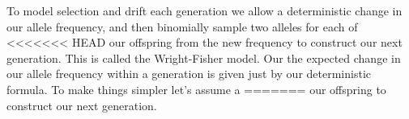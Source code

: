 

 To model selection and drift each generation we allow a deterministic change in our
allele frequency, and then binomially sample two alleles for each of
<<<<<<< HEAD
our offspring from the new frequency to construct our next
generation. This is called the Wright-Fisher model. Our the expected change in our allele frequency within a generation is given just by our
deterministic formula. To make things simpler let's assume a
=======
our offspring to construct our next generation.


